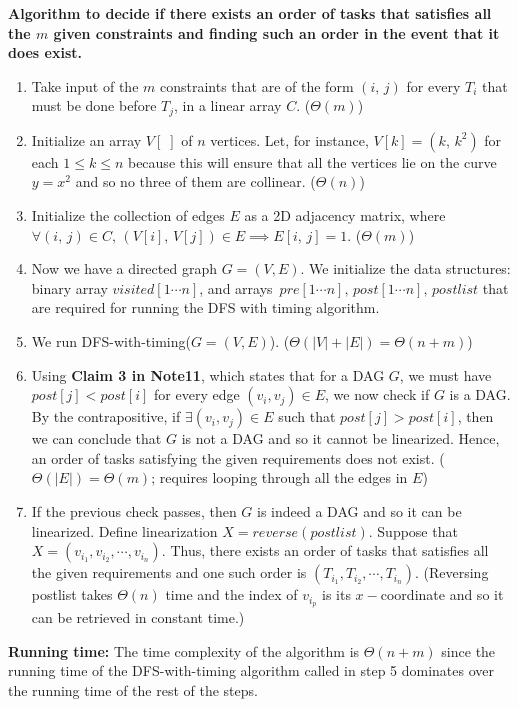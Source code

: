 \documentclass[tikz, letterpaper,12pt]{article}
\begin{document}
\textbf{Algorithm to decide if there exists an order of tasks that satisfies all the $m$ given constraints and finding such an order in the event that it does exist.} 
\begin{enumerate}
  \item Take input of the $m$ constraints that are of the form $(i,\,j)$ for every $T_i$ that must be done before $T_j$, in a linear array $C$. ($\Theta(m)$)
  \item Initialize an array $V[\;]$ of $n$ vertices. Let, for instance, $V[k]=(k,\,k^2)$ for each $1\leq k\leq n$ because this will ensure that all the vertices lie on the curve $y=x^2$ and so no three of them are collinear. ($\Theta(n)$)
  \item Initialize the collection of edges $E$ as a 2D adjacency matrix, where $\forall (i,\,j)\in C,\,(V[i],\,V[j])\in E\implies E[i,\,j]=1$. ($\Theta(m)$)
  \item Now we have a directed graph $G=(V,E)$. We initialize the data structures: binary array $visited[1\cdots n]$, and arrays $\,pre[1\cdots n],\,post[1\cdots n],\,postlist$ that are required for running the DFS with timing algorithm.
  \item We run DFS-with-timing($G=(V,E)$). ($\Theta(|V|+|E|)=\Theta(n+m)$)
  \item Using \textbf{Claim 3 in Note11}, which states that for a DAG $G$, we must have $post[j]<post[i]$ for every edge $(v_i,v_j)\in E$, we now check if $G$ is a DAG. By the contrapositive, if $\exists (v_i,v_j)\in E$ such that $post[j]>post[i]$, then we can conclude that $G$ is not a DAG and so it cannot be linearized. Hence, an order of tasks satisfying the given requirements does not exist. ($\Theta(|E|)=\Theta(m)$; requires looping through all the edges in $E$)
  \item If the previous check passes, then $G$ is indeed a DAG and so it can be linearized. Define linearization $X=reverse(postlist)$. Suppose that $X=(v_{i_1},v_{i_2},\cdots,v_{i_n})$. Thus, there exists an order of tasks that satisfies all the given requirements and one such order is $(T_{i_1},T_{i_2},\cdots,T_{i_n})$. (Reversing postlist takes $\Theta(n)$ time and the index of $v_{i_p}$ is its $x-$coordinate and so it can be retrieved in constant time.)
\end{enumerate}

\textbf{Running time:} The time complexity of the algorithm is $\Theta(n+m)$ since the running time of the DFS-with-timing algorithm called in step 5 dominates over the running time of the rest of the steps.
\end{document}
